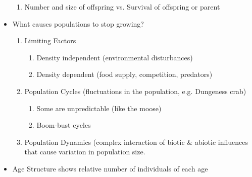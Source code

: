 \documentclass[12pt]{article}
\begin{document}
\begin{itemize}
    \begin{enumerate}

      \item Number and size of offspring vs. Survival of offspring or parent

    \end{enumerate}

  \item What causes populations to stop growing?

    \begin{enumerate}

      \item Limiting Factors

        \begin{enumerate}

          \item Density independent (environmental disturbances)

          \item Density dependent (food supply, competition, predators)

        \end{enumerate}

      \item Population Cycles (fluctuations in the population, e.g. Dungeness crab)

        \begin{enumerate}

          \item Some are unpredictable (like the moose)

          \item Boom-bust cycles

        \end{enumerate}

      \item Population Dynamics (complex interaction of biotic \& abiotic influences that cause variation in population size.

    \end{enumerate}

  \item Age Structure shows relative number of individuals of each age

\end{itemize}
\end{document}
